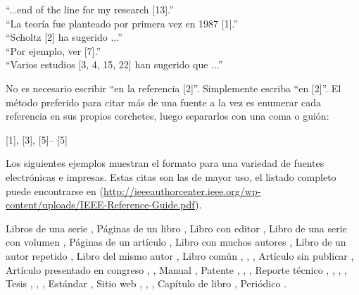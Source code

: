 \documentclass{innosoft}
\begin{document}
``...end of the line for my research [13].''\\
``La teor\'ia fue planteado por primera vez en 1987 [1].''\\
``Scholtz [2] ha sugerido ...''\\
``Por ejemplo, ver [7].''\\
``Varios estudios [3, 4, 15, 22] han sugerido que ...''

No es necesario escribir ``en la referencia [2]''. Simplemente escriba ``en [2]''. El m\'etodo preferido para citar m\'as de una fuente a la vez es enumerar cada referencia en sus propios corchetes, luego separarlos con una coma o gui\'on:

[1], [3], [5]\newline
[1] -- [5]

Los siguientes ejemplos muestran el formato para una variedad de fuentes electr\'onicas e impresas. Estas citas son las de mayor uso, el listado completo puede encontrarse en (\url{http://ieeeauthorcenter.ieee.org/wp-content/uploads/IEEE-Reference-Guide.pdf}).

Libros de una serie \cite{IEEEexample:incollectionwithseries}, P\'aginas de un libro \cite{IEEEexample:inbookpagesnote}, Libro con editor \cite{IEEEexample:bookwitheditor}, Libro de una serie con volumen \cite{IEEEexample:bookwithseriesvolume}, P\'aginas de un art\'iculo \cite{IEEEexample:articlelargepages}, Libro con muchos autores \cite{IEEEexample:incollectionmanyauthors}, Libro de un autor repetido \cite{IEEEexample:repeatedauthorone}, Libro del mismo autor \cite{IEEEexample:repeatedauthortwo}, Libro com\'un \cite{IEEEexample:book_typical}, \cite{IEEEexample:book}, \cite{IEEEexample:inbook}, Art\'iculo sin publicar \cite{IEEEexample:TBPmisc}, Art\'iculo presentado en congreso \cite{IEEEexample:presentedatconf}, \cite{IEEEexample:articledualmonths}, Manual \cite{IEEEexample:motmanual}, Patente \cite{IEEEexample:uspat}, \cite{IEEEexample:jppat}, \cite{IEEEexample:frenchpatreq}, Reporte t\'ecnico \cite{IEEEexample:techreptype}, \cite{IEEEexample:techrepstdsub}, \cite{IEEEexample:techrep}, \cite{IEEEexample:techreptypeii}, Tesis \cite{IEEEexample:phdurl}, \cite{IEEEexample:masterstype}, \cite{IEEEexample:masters}, Est\'andar \cite{IEEEexample:standard}, Sitio web \cite{IEEEexample:electronhowinfo}, \cite{IEEEexample:electronorgadd}, \cite{IEEEexample:electronhowinfo2}, Cap\'itulo de libro \cite{IEEEexample:incollection_chpp}, Peri\'odico \cite{IEEEexample:periodical}.  



\end{document}

